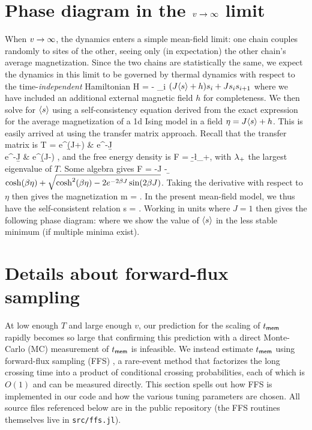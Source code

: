 \documentclass[12pt]{article}
\newcommand{\tmem}{t_{\sf mem}}
\begin{document}
\section{Phase diagram in the $v\rightarrow \infty$ limit}

When $v \rightarrow \infty$, the dynamics enters a simple mean-field limit: one chain couples randomly to sites of the other, seeing only (in expectation) the other chain's average magnetization. Since the two chains are statistically the same, we expect the dynamics in this limit to be governed by thermal dynamics with respect to the time-{\it independent} Hamiltonian 
\be H = - \sum_i \( (J \lan s\ran + h) s_i + J s_is_{i+1}\)\ee
where we have included an additional external magnetic field $h$ for completeness.  
We then solve for $\langle s\rangle$ using a self-consistency equation derived from the exact expression for the average magnetization of a 1d Ising model in a field $\eta=J \langle s \rangle + h$. This is easily arrived at using the transfer matrix approach. Recall that the transfer matrix is 
\be T = \bpm e^{\b (J+\eta)} & e^{-\b J} \\ e^{-\b J} & e^{\b(J-\eta)} \epm,\ee 
and the free energy density is 
\be F = -\b \ln \l_+,\ee 
with $\lambda_+$ the largest eigenvalue of $T$. Some algebra gives 
\be F = -J - \b \ln\( \cosh(\b \eta) + \sqrt{\cosh^2(\b\eta) - 2e^{-2\b J} \sin(2\b J)}\).\ee 
Taking the derivative with respect to $\eta$ then gives the magnetization 
\be m = .\ee 
In the present mean-field model, we thus have the self-consistent relation 
\be \lan s \ran = .\ee 
Working in units where $J=1$ then gives the following phase diagram: 
\be {}\ee 
where we show the value of $\langle s\rangle$ in the less stable minimum (if multiple minima exist). 

\section{Details about forward-flux sampling}
\label{sec:ffs}

At low enough $T$ and large enough $v$, our prediction for the scaling of $\tmem$ rapidly becomes so large that confirming this prediction with a direct Monte-Carlo (MC) measurement of $\tmem$ is infeasible. We instead estimate $\tmem$ using forward-flux sampling (FFS) \cite{allen2009forward}, a rare-event method that factorizes the long crossing time into a product of conditional crossing probabilities, each of which is $O(1)$ and can be measured directly. This section spells out how FFS is implemented in our code and how the various tuning parameters are chosen. All  source files referenced below are in the public repository \cite{code} (the FFS routines themselves live in \texttt{src/ffs.jl}).
\end{document}
